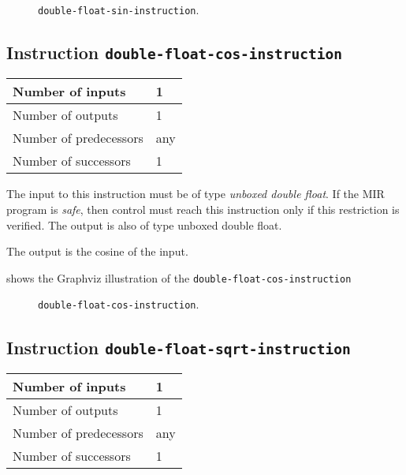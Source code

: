 \begin{figure}
\begin{center}
\end{center}
\caption{\label{fig-double-float-sin-instruction}
\texttt{double-float-sin-instruction}.}
\end{figure}

\subsection{Instruction \texttt{double-float-cos-instruction}}
\label{mir-instruction-double-float-div}

\begin{tabular}{|l|l|}
\hline
Number of inputs & 1\\
\hline
Number of outputs & 1\\
\hline
Number of predecessors & any\\
\hline
Number of successors & 1\\
\hline
\end{tabular}

The input to this instruction must be of type \emph{unboxed double
  float}.  If the MIR program is \emph{safe}, then control must reach
this instruction only if this restriction is verified.  The output is
also of type unboxed double float.

The output is the cosine of the input.

 shows the Graphviz illustration of the
\texttt{double-float-cos-instruction}

\begin{figure}
\begin{center}
\end{center}
\caption{\label{fig-double-float-cos-instruction}
\texttt{double-float-cos-instruction}.}
\end{figure}

\subsection{Instruction \texttt{double-float-sqrt-instruction}}
\label{mir-instruction-double-float-div}

\begin{tabular}{|l|l|}
\hline
Number of inputs & 1\\
\hline
Number of outputs & 1\\
\hline
Number of predecessors & any\\
\hline
Number of successors & 1\\
\hline
\end{tabular}

